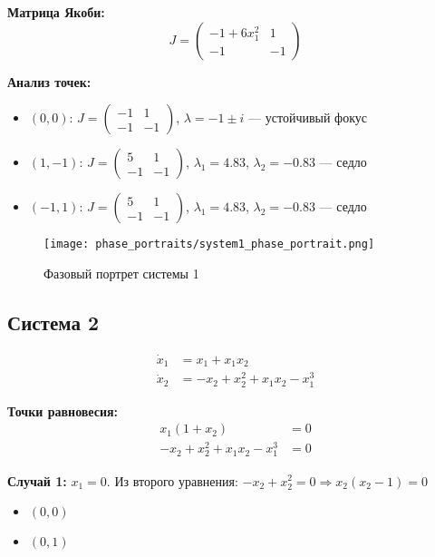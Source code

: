 \textbf{Матрица Якоби:}
$$J = \begin{pmatrix} -1 + 6x_1^2 & 1 \\ -1 & -1 \end{pmatrix}$$

\textbf{Анализ точек:}
\begin{itemize}
\item $(0, 0)$: $J = \begin{pmatrix} -1 & 1 \\ -1 & -1 \end{pmatrix}$, $\lambda = -1 \pm i$ --- устойчивый фокус
\item $(1, -1)$: $J = \begin{pmatrix} 5 & 1 \\ -1 & -1 \end{pmatrix}$, $\lambda_1 = 4.83$, $\lambda_2 = -0.83$ --- седло
\item $(-1, 1)$: $J = \begin{pmatrix} 5 & 1 \\ -1 & -1 \end{pmatrix}$, $\lambda_1 = 4.83$, $\lambda_2 = -0.83$ --- седло
\end{itemize}

\begin{figure}[H]
\centering
\texttt{[image: phase\_portraits/system1\_phase\_portrait.png]}
\caption{Фазовый портрет системы 1}
\label{fig:system1_phase_portrait}
\end{figure}

\subsection*{Система 2}

\begin{align}
\dot{x}_1 &= x_1 + x_1 x_2 \\
\dot{x}_2 &= -x_2 + x_2^2 + x_1 x_2 - x_1^3
\end{align}

\textbf{Точки равновесия:}
\begin{align}
x_1(1 + x_2) &= 0 \\
-x_2 + x_2^2 + x_1 x_2 - x_1^3 &= 0
\end{align}

\textbf{Случай 1:} $x_1 = 0$. Из второго уравнения: $-x_2 + x_2^2 = 0 \Rightarrow x_2(x_2 - 1) = 0$
\begin{itemize}
\item $(0, 0)$
\item $(0, 1)$
\end{itemize}

